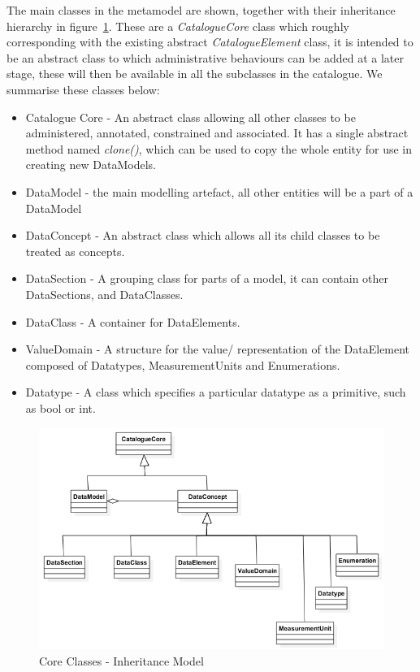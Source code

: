 \documentclass{article}
\begin{document}
The main classes in the metamodel are shown, together with their inheritance hierarchy in figure~\ref{fig:inheritance}. These are a \emph{CatalogueCore} class which roughly corresponding with the existing abstract \emph{CatalogueElement} class, it is intended to be an abstract class to which administrative behaviours can be added at a later stage, these will then be available in all the subclasses in the catalogue. We summarise these classes below:
\begin{itemize}
\item Catalogue Core - An abstract class allowing all other classes to be administered, annotated, constrained and associated. It has a single abstract method named \emph{clone()}, which can be used to copy the whole entity for use in creating new DataModels.
\item DataModel - the main modelling artefact, all other entities will be a part of a DataModel
\item DataConcept - An abstract class which allows all its child classes to be treated as concepts.
\item DataSection - A grouping class for parts of a model, it can contain other DataSections, and DataClasses.
\item DataClass - A container for DataElements.
\item ValueDomain - A structure for the value/ representation of the DataElement composed of Datatypes, MeasurementUnits and Enumerations.
\item Datatype - A class which specifies a particular datatype as a primitive, such as bool or int.
\end{itemize}

 \begin{figure}[here]
\includegraphics[scale=0.4]{images/inheritance}
\caption{Core Classes - Inheritance Model} 
\label{fig:inheritance}
\end{figure}
\end{document}

